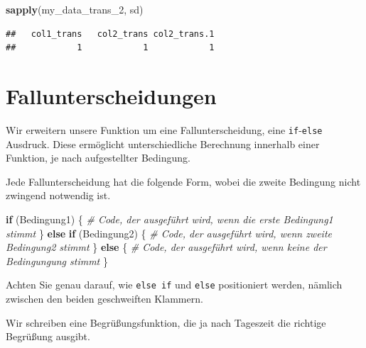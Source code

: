 \documentclass[]{book}
\newenvironment{Shaded}{\begin{snugshade}}{\end{snugshade}}
\newcommand{\CommentTok}[1]{\textcolor[rgb]{0.56,0.35,0.01}{\textit{#1}}}
\newcommand{\ControlFlowTok}[1]{\textcolor[rgb]{0.13,0.29,0.53}{\textbf{#1}}}
\newcommand{\DecValTok}[1]{\textcolor[rgb]{0.00,0.00,0.81}{#1}}
\newcommand{\KeywordTok}[1]{\textcolor[rgb]{0.13,0.29,0.53}{\textbf{#1}}}
\newcommand{\NormalTok}[1]{#1}
\begin{document}
\begin{Shaded}
\begin{Highlighting}[]
\KeywordTok{sapply}\NormalTok{(my_data_trans_}\DecValTok{2}\NormalTok{, sd)}
\end{Highlighting}
\end{Shaded}

\begin{verbatim}
##   col1_trans   col2_trans col2_trans.1 
##            1            1            1
\end{verbatim}

\hypertarget{fallunterscheidungen}{%
\section{Fallunterscheidungen}\label{fallunterscheidungen}}

Wir erweitern unsere Funktion um eine Fallunterscheidung, eine \texttt{if}-\texttt{else} Ausdruck. Diese ermöglicht unterschiedliche Berechnung innerhalb einer Funktion, je nach aufgestellter Bedingung.

Jede Fallunterscheidung hat die folgende Form, wobei die zweite Bedingung nicht zwingend notwendig ist.

\begin{Shaded}
\begin{Highlighting}[]
\ControlFlowTok{if}\NormalTok{ (Bedingung1) \{}
  \CommentTok{# Code, der ausgeführt wird, wenn die erste Bedingung1 stimmt}
\NormalTok{\} }\ControlFlowTok{else} \ControlFlowTok{if}\NormalTok{ (Bedingung2) \{}
  \CommentTok{# Code, der ausgeführt wird, wenn zweite Bedingung2 stimmt}
\NormalTok{\} }\ControlFlowTok{else}\NormalTok{ \{}
  \CommentTok{# Code, der ausgeführt wird, wenn keine der Bedingungung stimmt}
\NormalTok{\}}
\end{Highlighting}
\end{Shaded}

Achten Sie genau darauf, wie \texttt{else\ if} und \texttt{else} positioniert werden, nämlich zwischen den beiden geschweiften Klammern.

Wir schreiben eine Begrüßungsfunktion, die ja nach Tageszeit die richtige Begrüßung ausgibt.
\end{document}
